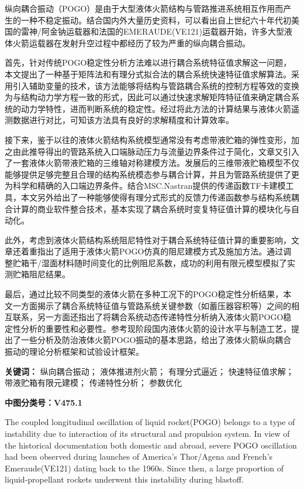 

纵向耦合振动（POGO）是由于大型液体火箭结构与管路推进系统相互作用而产生的一种不稳定振动。结合国内外大量历史资料，可以看出自上世纪六十年代初美国的雷神/阿金钠运载器和法国的EMERAUDE(VE121)运载器开始，许多大型液体火箭运载器在发射升空过程中都经历了较为严重的纵向耦合振动。

首先，针对传统POGO稳定性分析方法难以进行耦合系统特征值求解这一问题，本文提出了一种基于矩阵法和有理分式拟合法的耦合系统快速特征值求解算法。采用引入辅助变量的技术，该方法能够将结构与管路耦合系统的控制方程等效的变换为与结构动力学方程一致的形式，因此可以通过快速求解矩阵特征值来确定耦合系统的动力学特性，进而判断系统的稳定性。经过将此方法的计算结果与液体火箭遥测数据进行对比，可知该方法具有良好的求解精度和计算效率。

接下来，鉴于以往的液体火箭结构系统模型通常没有考虑带液贮箱的弹性变形，加之由此推导得出的管路系统入口端脉动压力与流量边界条件过于简化，文章又引入了一套液体火箭带液贮箱的三维轴对称建模方法。发展后的三维带液贮箱模型不仅能够提供足够完整且合理的结构系统模态参与耦合计算，并且为管路系统提供了更为科学和精确的入口端边界条件。结合MSC.Nastran提供的传递函数TF卡建模工具，本文另外给出了一种能够使得有理分式形式的反馈力传递函数参与结构系统耦合计算的商业软件整合技术，基本实现了耦合系统时变复特征值计算的模块化与自动化。

此外，考虑到液体火箭结构系统阻尼特性对于耦合系统特征值计算的重要影响，文章还着重指出了适用于液体火箭POGO仿真的阻尼建模方式及施加方法。通过调整贮箱干/湿面材料随时间变化的比例阻尼系数，成功的利用有限元模型模拟了实测贮箱阻尼结果。

最后，通过比较不同类型的液体火箭在多种工况下的POGO稳定性分析结果，本文一方面揭示了耦合系统特征值与管路系统关键参数（如蓄压器容积等）之间的相互联系，另一方面还指出了将耦合系统动态传递特性分析纳入液体火箭POGO稳定性分析的重要性和必要性。参考现阶段国内液体火箭的设计水平与制造工艺，提出了一些分析及防治液体火箭POGO振动的基本思路，给出了液体火箭纵向耦合振动的理论分析框架和试验设计框架。

\bigskip
\noindent \textbf{关键词：\hspace{\Han}}
纵向耦合振动；\;
液体推进剂火箭；\;
有理分式逼近；\;
快速特征值求解；\;
带液贮箱有限元建模；\;
传递特性分析；\;
参数优化

\bigskip
\noindent \textbf{中图分类号：\hspace{\Han}V475.1}

The coupled longitudinal oscillation of liquid rocket(POGO) belongs to a type of instability due to interaction of its structural and propulsion system. In view of the historical documentation both domestic and abroad, severe POGO oscillation had been observed during launches of America's Thor/Agena and French's Emeraude(VE121) dating back to the 1960s. Since then, a large proportion of liquid-propellant rockets underwent this instability during blastoff.

